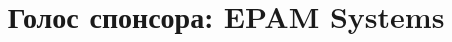 \documentclass[10pt, a5paper]{article}
\begin{document}
\title{Голос спонсора: EPAM Systems}
\date{}
\maketitle%
 
 ~

\newpage

~
\end{document}
